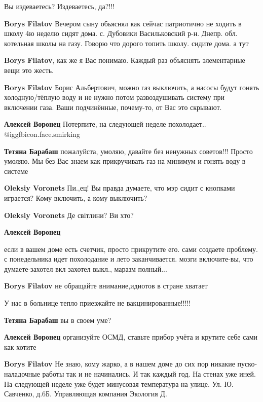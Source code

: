 \begin{itemize}
\begin{itemize}
Вы издеваетесь? Издеваетесь, да?!!!

\textbf{Borys Filatov} Вечером сыну обьяснял как сейчас патриотично не ходить в школу 4ю неделю сидят дома.
с. Дубовики Васильковский р-н.
Днепр. обл.
котельная школы на газу.
Говорю что дорого топить школу. сидите дома.
а тут

\textbf{Borys Filatov}, как же я Вас понимаю. Каждый раз объяснять элементарные вещи это жесть.

\textbf{Borys Filatov} Борис Альбертович, можно газ выключить, а насосы будут гонять холодную/тёплую воду и не нужно потом развоздушивать систему при включении газа. Ваши подчинённые, почему-то, от Вас это скрывают.

\textbf{Алексей Воронец} Потерпите, на следующей неделе похолодает..  @igg{fbicon.face.smirking} 

\textbf{Тетяна Барабаш} пожалуйста, умоляю, давайте без ненужных советов!!!
Просто умоляю. Мы без Вас знаем как прикручивать газ на минимум и гонять воду в системе

\textbf{Oleksiy Voronets} Пи.,ец! Вы правда думаете, что мэр сидит с кнопками играется? Кому включить, а кому выключить?

\textbf{Oleksiy Voronets} Де світлини? Ви хто?

\textbf{Алексей Воронец} 

если в вашем доме есть счетчик, просто прикрутите его. сами создаете проблему. с
понедельника идет похолодание и лето заканчивается. мозги включите-вы, что
думаете-захотел вкл захотел выкл., маразм полный...


\textbf{Borys Filatov} не обращайте внимание,идиотов в стране хватает

У нас в больнице тепло приезжайте не вакцинированные!!!!!

\textbf{Тетяна Барабаш} вы в своем уме?

\textbf{Алексей Воронец} организуйте ОСМД, ставьте прибор учёта и крутите себе сами как хотите

\textbf{Borys Filatov} Не знаю, кому жарко, а в нашем доме до сих пор никакие пуско-наладочные работы так и не начинались. И так каждый год. На стенах уже иней. На следующей неделе уже будет минусовая температура на улице. Ул. Ю. Савченко, д.6Б. Управляющая компания Экология Д.


\end{itemize}
\end{itemize}
